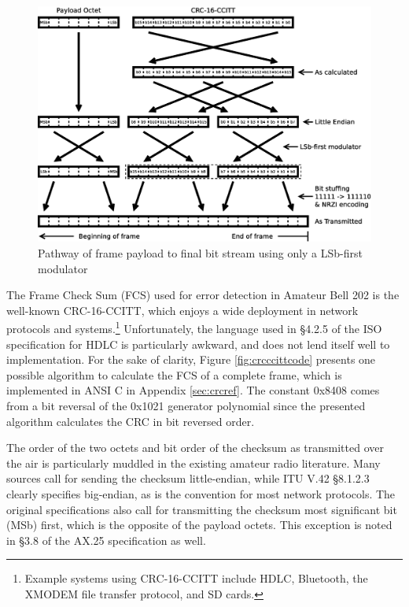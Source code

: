 \begin{figure}
	\centering
	\includegraphics[width=1.0\textwidth]{src/dia/bittwisting}
	\caption{Pathway of frame payload to final bit stream
	using only a LSb-first modulator}
	\label{fig:bittwisting}
\end{figure}


The Frame Check Sum (FCS) used for error detection in Amateur Bell 202
is the well-known CRC-16-CCITT, 
which enjoys a wide deployment in network protocols and 
systems.\footnote{Example systems using CRC-16-CCITT include HDLC, 
	Bluetooth, the XMODEM file 
transfer protocol, and SD cards.}
Unfortunately, the language used in \S4.2.5 of the ISO specification for
HDLC \cite{iso13239} is particularly awkward, 
and does not lend itself well to implementation.
For the sake of clarity, Figure \ref{fig:crcccittcode} 
presents one possible algorithm to
calculate the FCS of a complete frame, which is implemented in ANSI C in 
Appendix \ref{sec:crcref}.
The constant 0x8408 comes from a bit reversal of the 0x1021 generator polynomial
since the presented algorithm calculates the CRC in bit reversed order.

The order of the two octets and bit order of the checksum 
as transmitted over the air 
is particularly muddled in the existing amateur radio literature.
Many sources call for sending the
checksum little-endian, while ITU V.42 \S8.1.2.3 clearly specifies big-endian,
as is the convention for most network protocols.
The original specifications also call for transmitting the checksum most
significant bit (MSb) first, which is the opposite of the payload octets.
This exception is noted in \S3.8 of the AX.25 specification as well.

